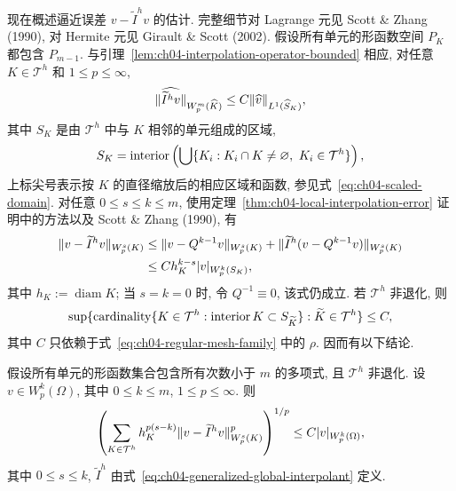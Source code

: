 现在概述逼近误差 $v-\widetilde I^h v$ 的估计. 完整细节对 Lagrange 元见 Scott \& Zhang (1990), 对 Hermite 元见 Girault \& Scott (2002). 假设所有单元的形函数空间 $P_K$ 都包含 $P_{m-1}$. 与引理~\ref{lem:ch04-interpolation-operator-bounded} 相应, 对任意 $K\in\mathcal T^h$ 和 $1\leq p\leq\infty$,
\[
\MathBookFormulaID{formula-ch04-generalized-interpolant-local-bound}
\|\widehat{\widetilde I^h v}\|_{W_p^m(\widehat K)}
\leq C\|\widehat v\|_{L^1(\widehat S_K)},
\]
其中 $S_K$ 是由 $\mathcal T^h$ 中与 $K$ 相邻的单元组成的区域,
\begin{equation}
\MathBookFormulaID{formula-ch04-element-patch}
\label{eq:ch04-element-patch}
S_K=\operatorname{interior}\left(\bigcup\{K_i:K_i\cap K\ne\varnothing,\ K_i\in\mathcal T^h\}\right),
\end{equation}
上标尖号表示按 $K$ 的直径缩放后的相应区域和函数, 参见式~\eqref{eq:ch04-scaled-domain}. 对任意 $0\leq s\leq k\leq m$, 使用定理~\ref{thm:ch04-local-interpolation-error} 证明中的方法以及 Scott \& Zhang (1990), 有
\begin{equation}
\MathBookFormulaID{formula-ch04-generalized-interpolation-local-error}
\label{eq:ch04-generalized-interpolation-local-error}
\begin{aligned}
\|v-\widetilde I^h v\|_{W_p^s(K)}
&\leq\|v-Q^{k-1}v\|_{W_p^s(K)}
+\|\widetilde I^h(v-Q^{k-1}v)\|_{W_p^s(K)}\\
&\leq Ch_K^{k-s}|v|_{W_p^k(S_K)},
\end{aligned}
\end{equation}
其中 $h_K:=\operatorname{diam}K$; 当 $s=k=0$ 时, 令 $Q^{-1}\equiv0$, 该式仍成立. 若 $\mathcal T^h$ 非退化, 则
\begin{equation}
\MathBookFormulaID{formula-ch04-element-patch-overlap-bound}
\label{eq:ch04-element-patch-overlap-bound}
\sup\{\operatorname{cardinality}\{K\in\mathcal T^h:\operatorname{interior}K\subset S_{\widetilde K}\}:\widetilde K\in\mathcal T^h\}
\leq C,
\end{equation}
其中 $C$ 只依赖于式~\eqref{eq:ch04-regular-mesh-family} 中的 $\rho$. 因而有以下结论.

\setcounter{thmcount}{11}
\begin{Theorem}
\label{thm:ch04-generalized-interpolation-global-error}
假设所有单元的形函数集合包含所有次数小于 $m$ 的多项式, 且 $\mathcal T^h$ 非退化. 设 $v\in W_p^k(\Omega)$, 其中 $0\leq k\leq m$, $1\leq p\leq\infty$. 则
\begin{equation}
\MathBookFormulaID{formula-ch04-generalized-interpolation-global-error}
\label{eq:ch04-generalized-interpolation-global-error}
\left(\sum_{K\in\mathcal T^h}h_K^{p(s-k)}
\|v-\widetilde I^h v\|_{W_p^s(K)}^p\right)^{1/p}
\leq C|v|_{W_p^k(\Omega)},
\end{equation}
其中 $0\leq s\leq k$, $\widetilde I^h$ 由式~\eqref{eq:ch04-generalized-global-interpolant} 定义.
\end{Theorem}

